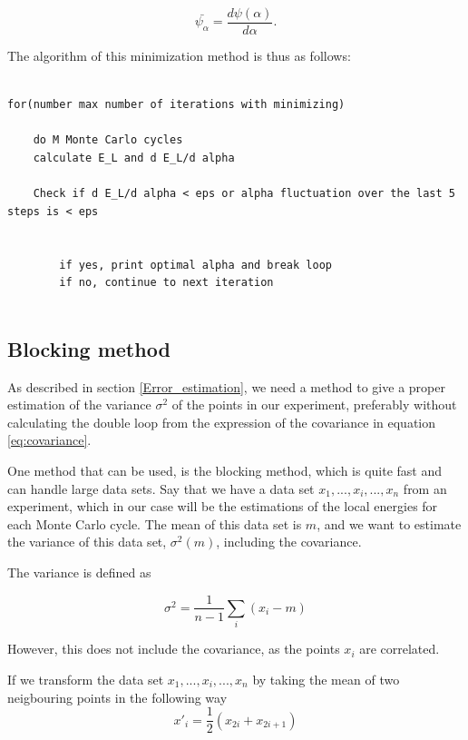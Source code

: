 \documentclass[norsk,a4paper,12pt]{article}
\begin{document}
\begin{equation}
	\bar{\psi_{\alpha}} = \frac{d \psi (\alpha)}{d \alpha}.
\end{equation}

The algorithm of this minimization method is thus as follows:

\lstset{basicstyle=\scriptsize}
\begin{lstlisting}

for(number max number of iterations with minimizing)
	
	do M Monte Carlo cycles
	calculate E_L and d E_L/d alpha 
	
	Check if d E_L/d alpha < eps or alpha fluctuation over the last 5 steps is < eps
	
	
		if yes, print optimal alpha and break loop
		if no, continue to next iteration


\end{lstlisting}

\subsection{Blocking method}
\label{Blocking}

As described in section \ref{Error_estimation}, we need a method to give a proper estimation of the variance $\sigma^2$ of the points in our experiment, preferably without calculating the double loop from the expression of the covariance in equation \ref{eq:covariance}. 
\par 
\vspace{3mm}

One method that can be used, is the blocking method, which is quite fast and can handle large data sets. Say that we have a data set ${x_1, ...,x_i,..., x_n}$ from an experiment, which in our case will be the estimations of the local energies for each Monte Carlo cycle. The mean of this data set is $m$, and we want to estimate the variance of this data set, $\sigma^2 (m)$, including the covariance.

The variance is defined as 

\begin{equation}
	\sigma^2 = \frac{1}{n-1} \sum_i (x_i - m)
\end{equation}

However, this does not include the covariance, as the points $x_i$ are correlated.

If we transform the data set ${x_1, ...,x_i,..., x_n}$ by taking the mean of two neigbouring points in the following way
\begin{equation}
	x'_i = \frac{1}{2}(x_{2i} + x_{2i+1})
\end{equation}
\end{document}
